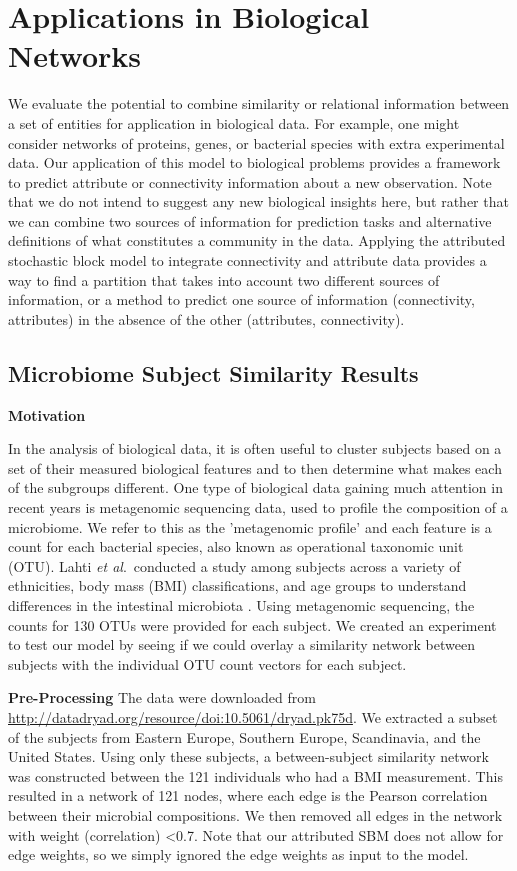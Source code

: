 \documentclass[journal]{IEEEtran}
\begin{document}
\section{Applications in Biological Networks}
We evaluate the potential to combine similarity or relational information between a set of entities for application in biological data. For example, one might consider networks of proteins, genes, or bacterial species with extra experimental data. Our application of this model to biological problems provides a framework to predict attribute or connectivity information about a new observation.  Note that we do not intend to suggest any new biological insights here, but rather that we can combine two sources of information for prediction tasks and alternative definitions of what constitutes a community in the data. Applying the attributed stochastic block model to integrate connectivity and attribute data provides a way to find a partition that takes into account two different sources of information, or a method to predict one source of information (connectivity, attributes) in the absence of the other (attributes, connectivity). 

\subsection{Microbiome Subject Similarity Results}

{\bf Motivation}

In the analysis of biological data, it is often useful to cluster subjects based on a set of their measured biological features and to then determine what makes each of the subgroups different. One type of biological data gaining much attention in recent years is metagenomic sequencing data, used to profile the composition of a microbiome. We refer to this as the 'metagenomic profile' and each feature is a count for each bacterial species, also known as operational taxonomic unit (OTU). Lahti \emph{et al}.\ conducted a study among subjects across a variety of ethnicities, body mass (BMI) classifications, and age groups to understand differences in the intestinal microbiota \cite{microbiomedata}. Using metagenomic sequencing, the counts for 130 OTUs were provided for each subject. We created an experiment to test our model by seeing if we could overlay a similarity network between subjects with the individual OTU count vectors for each subject. 

{\bf Pre-Processing}
The data were downloaded from \url{http://datadryad.org/resource/doi:10.5061/dryad.pk75d}. We extracted a subset of the subjects from Eastern Europe, Southern Europe, Scandinavia, and the United States. Using only these subjects, a between-subject similarity network was constructed between the 121 individuals who had a BMI measurement. This resulted in a network of 121 nodes, where each edge is the Pearson correlation between their microbial compositions. We then removed all edges in the network with weight (correlation) <0.7. Note that our attributed SBM does not allow for edge weights, so we simply ignored the edge weights as input to the model.
\end{document}
